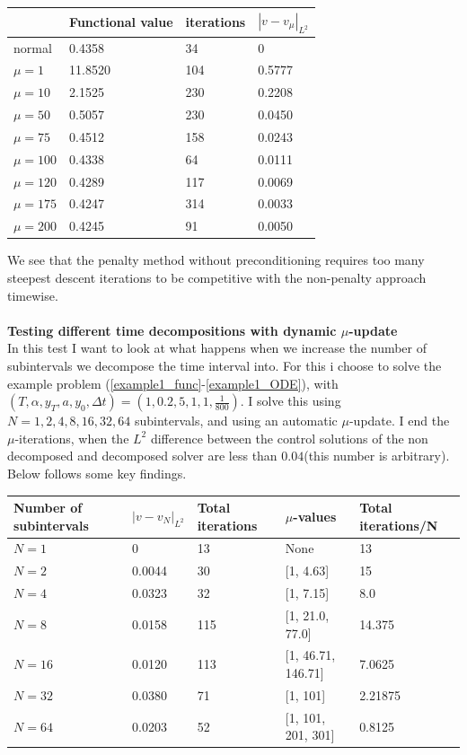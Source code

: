 \documentclass[11pt,a4paper]{article}
\begin{document}
 \begin{center}
    \begin{tabular}{| l | l | l | l |}
    \hline
     & Functional value &iterations  & $|v-v_{\mu}|_{L^2}$   \\ \hline
    normal &0.4358 & 34& 0 	\\ \hline
    $\mu=1$ & 11.8520& 104&0.5777	\\ \hline
    $\mu=10$ &2.1525 &230& 0.2208	\\ \hline
    $\mu=50$ &0.5057&230& 0.0450	\\ \hline
    $\mu=75$ &0.4512 &158& 0.0243\\ \hline
    $\mu=100$ &0.4338&64&0.0111	\\ \hline
    $\mu=120$ &0.4289&117&0.0069\\ \hline
    $\mu=175$ &0.4247&314&0.0033\\ \hline
    $\mu=200$ &0.4245&91&0.0050\\ \hline
    \end{tabular}
\end{center}
We see that the penalty method without preconditioning requires too many steepest descent iterations to be competitive with the non-penalty approach timewise. 
\\
\\
\textbf{Testing different time decompositions with dynamic $\mu$-update}
\\
In this test I want to look at what happens when we increase the number of subintervals we decompose the time interval into. For this i choose to solve the example problem (\ref{example1_func}-\ref{example1_ODE}), with $(T,\alpha,y_T,a,y_0,\Delta t)=(1,0.2,5,1,1,\frac{1}{800})$. I solve this using $N=1,2,4,8,16,32,64$ subintervals, and using an automatic $\mu$-update. I end the $\mu$-iterations, when the $L^2$ difference between the control solutions of the non decomposed and decomposed solver are less than $0.04$(this number is arbitrary). Below follows some key findings.
 \begin{center}
    \begin{tabular}{| l | l | l | l | l |}
    \hline
     Number of subintervals & $|v-v_{N}|_{L^2}$ & Total iterations & $\mu$-values &  Total iterations/N  \\ \hline
    $N=1$ & 0 &13 & None	&13\\ \hline
    $N=2$& 0.0044 &30 &[1, 4.63] 	&15\\ \hline
    $N=4$ & 0.0323 &32 &[1, 7.15]&8.0\\ \hline
    $N=8$ & 0.0158 & 115& [1, 21.0, 77.0]	&14.375\\ \hline
    $N=16$ & 0.0120 &113 & [1, 46.71, 146.71]&7.0625	\\ \hline
    $N=32$ & 0.0380 &71 & [1, 101]&2.21875\\ \hline
    $N=64$ & 0.0203 & 52& [1, 101, 201, 301]	&0.8125\\ \hline
    \end{tabular}
\end{center}


\end{document}
